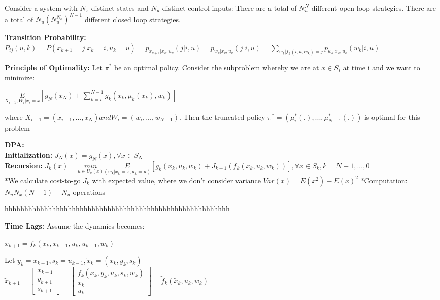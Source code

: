 \documentclass[10pt,landscape]{article}
\begin{document}
\begin{multicols*}{4}
Consider a system with $N_x$ distinct states and $N_u$ distinct control inputs:
There are a total of $N_u ^ N$ different open loop strategies.
There are a total of $N_u(N_u ^ {N_x}) ^ {N-1}$ different closed loop strategies.

\textbf{Transition Probability:} \\
$P_{ij}(u,k) = P(x_{k+1} = j | x_k = i, u_k = u) = p_{x_{k+1}|x_k,u_k}(j|i,u) = p_{w_k|x_k,u_k}(j|i,u) = \sum_{\bar{w}_k | f_k(i,u,\bar{w}_k) = j} p_{w_k|x_k,u_k}(\bar{w}_k|i,u) $


\textbf{Principle of Optimality:} Let $\pi ^ *$ be an optimal policy. Consider the subproblem whereby
we are at $x \in S_i$ at time i and we want to minimize:

$ \underset{X_{i+1}, W_i| x_i=x}{E} [g_N(x_N) + \sum_{k=i}^{N-1} g_k(x_k, \mu_k(x_k), w_k)]$

where $X_{i+1} = (x_{i+1},...,x_N) and W_i = (w_i,...,w_{N-1})$. Then the truncated policy $\pi ^ * = (\mu_i ^ *(.),...,\mu_{N-1} ^ * (.))$ is optimal for this problem


\textbf{DPA:}\\
\textbf{Initialization:} $J_N(x) = g_N(x), \forall x \in S_N$\\
\textbf{Recursion:} 
$J_k(x) = \underset{u \in U_k(x)}{min} \underset{(w_k | x_k=x, u_k=u)}{E} [g_k(x_k,u_k, w_k) + J_{k+1} (f_k(x_k,u_k,w_k))], \forall x \in S_k, k = N-1,...,0$\\

*We calculate cost-to-go $J_k$ with expected value, where we don't consider variance $Var(x) = E(x^2) - E(x) ^ 2$
*Computation: $N_uN_x(N-1)+N_u$ operations

hhhhhhhhhhhhhhhhhhhhhhhhhhhhhhhhhhhhhhhhhhhhhhhhhhhhhhhhh
 
\textbf{Time Lags:}
Assume the dynamics becomes:\\
\begin{center}
	$x_{k+1} = f_k(x_k, x_{k-1}, u_k, u_{k-1}, w_k)$
\end{center}
Let $y_k=x_{k-1}, s_k = u_{k-1}, \tilde{x}_k = (x_k, y_k, s_k)$\\
$\tilde{x}_{k+1} = \begin{bmatrix}
	x_{k+1}\\
	y_{k+1}\\
	s_{k+1}
\end{bmatrix} = \begin{bmatrix}
f_k(x_k,y_k,u_k,s_k,w_k)\\
x_k\\
u_k
\end{bmatrix} = \tilde{f}_k(\tilde{x}_k,u_k,w_k)$


\end{multicols*}
\end{document}

